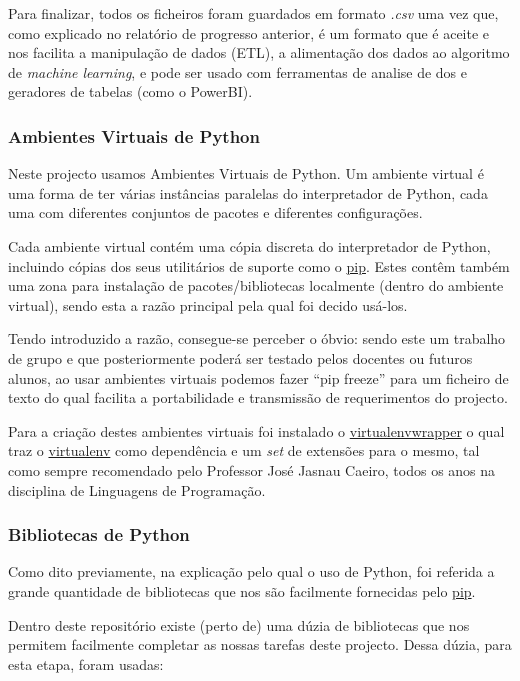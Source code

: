 Para finalizar, todos os ficheiros foram guardados em formato \textit{.csv} uma vez que, como explicado no relatório de progresso anterior, é um formato que é aceite e nos facilita a manipulação de dados (ETL), a alimentação dos dados ao algoritmo de \textit{machine learning}, e pode ser usado com ferramentas de analise de dos e geradores de tabelas (como o PowerBI).

\subsubsection{Ambientes Virtuais de Python}
Neste projecto usamos Ambientes Virtuais de Python. Um ambiente virtual é uma forma de ter várias instâncias paralelas do interpretador de Python, cada uma com diferentes conjuntos de pacotes e diferentes configurações.

Cada ambiente virtual contém uma cópia discreta do interpretador de Python, incluindo cópias dos seus utilitários de suporte como o \href{https://pypi.org/project/pip/}{pip}. Estes contêm também uma zona para instalação de pacotes/bibliotecas localmente (dentro do ambiente virtual), sendo esta a razão principal pela qual foi decido usá-los.

Tendo introduzido a razão, consegue-se perceber o óbvio: sendo este um trabalho de grupo e que posteriormente poderá ser testado pelos docentes ou futuros alunos, ao usar ambientes virtuais podemos fazer ``pip freeze'' para um ficheiro de texto do qual facilita a portabilidade e transmissão de requerimentos do projecto.

Para a criação destes ambientes virtuais foi instalado o \href{https://pypi.org/project/virtualenvwrapper/}{virtualenvwrapper} o qual traz o \href{https://pypi.org/project/virtualenv/}{virtualenv} como dependência e um \textit{set} de extensões para o mesmo, tal como sempre recomendado pelo Professor José Jasnau Caeiro, todos os anos na disciplina de Linguagens de Programação.

\subsubsection{Bibliotecas de Python}
Como dito previamente, na explicação pelo qual o uso de Python, foi referida a grande quantidade de bibliotecas que nos são facilmente fornecidas pelo \href{https://pypi.org/project/pip/}{pip}.

Dentro deste repositório existe (perto de) uma dúzia de bibliotecas que nos permitem facilmente completar as nossas tarefas deste projecto. Dessa dúzia, para esta etapa, foram usadas:

